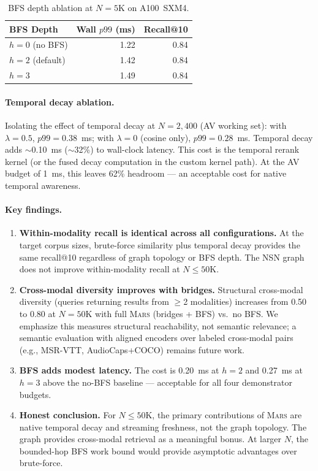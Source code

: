 \documentclass[11pt]{article}
\newcommand{\mars}{\textsc{Mars}}
\begin{document}
\begin{table}[ht]
\centering
\small
\caption{BFS depth ablation at $N{=}5$K on A100~SXM4.}
\label{tab:bfs_depth}
\begin{tabular}{lrr}
\toprule
\textbf{BFS Depth} & \textbf{Wall $p99$ (ms)} & \textbf{Recall@10} \\
\midrule
$h{=}0$ (no BFS)   & 1.22 & 0.84 \\
$h{=}2$ (default)   & 1.42 & 0.84 \\
$h{=}3$             & 1.49 & 0.84 \\
\bottomrule
\end{tabular}
\end{table}

\paragraph{Temporal decay ablation.} Isolating the effect of temporal
decay at $N{=}2{,}400$ (AV working set): with $\lambda{=}0.5$,
$p99{=}0.38$~ms; with $\lambda{=}0$ (cosine only), $p99{=}0.28$~ms.
Temporal decay adds $\sim$0.10~ms ($\sim$32\%) to wall-clock latency.
This cost is the temporal rerank kernel (or the fused decay computation
in the custom kernel path). At the AV budget of 1~ms, this leaves
62\% headroom --- an acceptable cost for native temporal awareness.

\paragraph{Key findings.}

\begin{enumerate}
\item \textbf{Within-modality recall is identical across all
  configurations.} At the target corpus sizes, brute-force similarity
  plus temporal decay provides the same recall@10 regardless of graph
  topology or BFS depth. The NSN graph does not improve within-modality
  recall at $N \leq 50$K.

\item \textbf{Cross-modal diversity improves with bridges.}
  Structural cross-modal diversity (queries returning results from
  $\geq$2 modalities) increases from 0.50 to 0.80 at $N{=}50$K with
  full \mars{} (bridges + BFS) vs.\ no BFS. We emphasize this measures
  structural reachability, not semantic relevance; a semantic evaluation
  with aligned encoders over labeled cross-modal pairs (e.g.,
  MSR-VTT, AudioCaps+COCO) remains future work.

\item \textbf{BFS adds modest latency.} The cost is 0.20~ms at
  $h{=}2$ and 0.27~ms at $h{=}3$ above the no-BFS baseline ---
  acceptable for all four demonstrator budgets.

\item \textbf{Honest conclusion.} For $N \leq 50$K, the primary
  contributions of \mars{} are native temporal decay and streaming
  freshness, not the graph topology. The graph provides cross-modal
  retrieval as a meaningful bonus. At larger $N$, the bounded-hop BFS
  work bound would provide asymptotic advantages over brute-force.
\end{enumerate}
\end{document}
